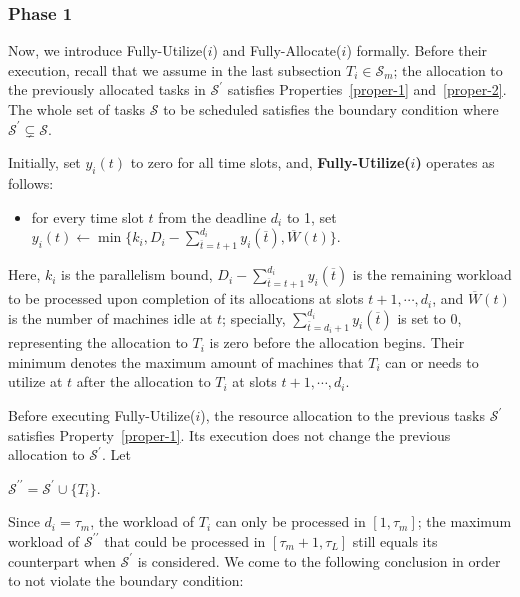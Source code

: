\documentclass[10pt,journal,compsoc]{IEEEtran}
\begin{document}
\subsubsection{Phase 1}
\label{sec.phase-1}










Now, we introduce Fully-Utilize($i$) and Fully-Allocate($i$) formally. Before their execution, recall that we assume in the last subsection $T_{i}\in\mathcal{S}_{m}$; the allocation to the previously allocated tasks in $\mathcal{S}^{\prime}$ satisfies Properties~\ref{proper-1} and~\ref{proper-2}. The whole set of tasks $\mathcal{S}$ to be scheduled satisfies the boundary condition where $\mathcal{S}^{\prime}\varsubsetneq\mathcal{S}$.


Initially, set $y_{i}(t)$ to zero for all time slots, and, \textbf{Fully-Utilize($i$)} operates as follows:\begin{itemize}
\item for every time slot $t$ from the deadline $d_{i}$ to 1, set $y_{i}(t)\leftarrow\min\{k_{i}, D_{i}-\sum_{\overline{t}=t+1}^{d_{i}}{y_{i}(\overline{t})}, \overline{W}(t)\}$.
\end{itemize}
Here, $k_{i}$ is the parallelism bound, $D_{i}-\sum_{\overline{t}=t+1}^{d_{i}}{y_{i}(\overline{t})}$ is the remaining workload to be processed upon completion of its allocations at slots $t+1, \cdots, d_{i}$, and $\overline{W}(t)$ is the number of machines idle at $t$; specially, $\sum_{\overline{t}=d_{i}+1}^{d_{i}}{y_{i}(\overline{t})}$ is set to 0, representing the allocation to $T_{i}$ is zero before the allocation begins. Their minimum denotes the maximum amount of machines that $T_{i}$ can or needs to utilize at $t$ after the allocation to $T_{i}$ at slots $t+1,\cdots, d_{i}$.


Before executing Fully-Utilize($i$), the resource allocation to the previous tasks $\mathcal{S}^{\prime}$ satisfies Property~\ref{proper-1}. Its execution does not change the previous allocation to $\mathcal{S}^{\prime}$. Let
\begin{center}
$\mathcal{S}^{\prime\prime}=\mathcal{S}^{\prime}\cup\{T_{i}\}$.
\end{center}
Since $d_{i}=\tau_{m}$, the workload of $T_{i}$ can only be processed in $[1, \tau_{m}]$; the maximum workload of $\mathcal{S}^{\prime\prime}$ that could be processed in $[\tau_{m}+1, \tau_{L}]$ still equals its counterpart when $\mathcal{S}^{\prime}$ is considered. We come to the following conclusion in order to not violate the boundary condition:
\end{document}
